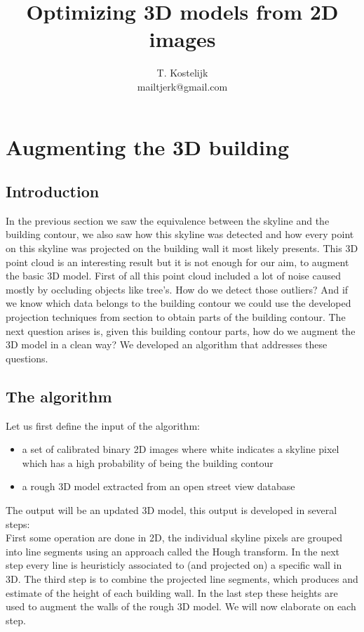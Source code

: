 \documentclass[10pt]{article}
\title{\sc Optimizing 3D models from 2D images}
\author{T. Kostelijk\\mailtjerk@gmail.com}
\begin{document}
\maketitle


\section{Augmenting the 3D building}






\subsection{Introduction}
In the previous section we saw the equivalence between the skyline and the building contour, we also saw how this skyline was detected and how every point on this skyline was projected on the building wall it most likely presents. 
This 3D point cloud is an interesting result but it is not enough for our aim, to augment the basic 3D model.
First of all this point cloud included a lot of noise caused mostly by occluding objects like tree's. How do we detect those outliers?
And if we know which data belongs to the building contour we could use the developed projection techniques from section %
to obtain parts of the building contour.
The next question arises is, given this building contour parts, how do we augment the 3D model in a clean way?
We developed an algorithm that addresses these questions.
\subsection{The algorithm}
Let us first define the input of the algorithm:
\begin{itemize}
	\item a set of calibrated binary 2D images where white indicates a skyline pixel which has a high probability of being the building contour
	\item a rough 3D model extracted from an open street view database
\end{itemize}
The output will be an updated 3D model, this output is developed in several steps:\\
First some operation are done in 2D, the individual skyline pixels are grouped into line segments using an approach called the Hough transform. In the next step every line is heuristicly associated to (and projected on) a specific wall in 3D. The third step is to combine the projected line segments, which produces and estimate of the height of each building wall. In the last step these heights are used to augment the walls of the rough 3D model.
We will now elaborate on each step.
\end{document}
